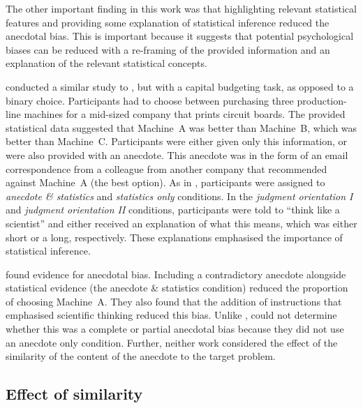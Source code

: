 \documentclass[a4paper, nobind, dvipsnames]{templates/ociamthesis}
\theoremstyle{definition}
\theoremstyle{definition}
\theoremstyle{definition}
\theoremstyle{definition}
\theoremstyle{remark}
\begin{document}
The other important finding in this work was that highlighting relevant
statistical features and providing some explanation of statistical inference
reduced the anecdotal bias. This is important because it suggests that potential
psychological biases can be reduced with a re-framing of the provided
information and an explanation of the relevant statistical concepts.

\textcite{wainberg2018} conducted a similar study to \textcite{wainberg2013}, but with a capital
budgeting task, as opposed to a binary choice. Participants had to choose
between purchasing three production-line machines for a mid-sized company that
prints circuit boards. The provided statistical data suggested that Machine~A
was better than Machine~B, which was better than Machine~C. Participants were
either given only this information, or were also provided with an anecdote. This
anecdote was in the form of an email correspondence from a colleague from
another company that recommended against Machine~A (the best option). As in
\textcite{wainberg2013}, participants were assigned to \emph{anecdote \& statistics} and
\emph{statistics only} conditions. In the \emph{judgment orientation I} and \emph{judgment
orientation II} conditions, participants were told to ``think like a scientist''
and either received an explanation of what this means, which was either short or
a long, respectively. These explanations emphasised the importance of
statistical inference.

\textcite{wainberg2018} found evidence for anecdotal bias. Including a contradictory
anecdote alongside statistical evidence (the anecdote \& statistics condition)
reduced the proportion of choosing Machine~A. They also found that the addition
of instructions that emphasised scientific thinking reduced this bias. Unlike
\textcite{wainberg2013}, \textcite{wainberg2018} could not determine whether this was a complete or
partial anecdotal bias because they did not use an anecdote only condition.
Further, neither work considered the effect of the similarity of the content of
the anecdote to the target problem.

\hypertarget{effect-of-similarity}{%
\subsection{Effect of similarity}\label{effect-of-similarity}}
\end{document}
